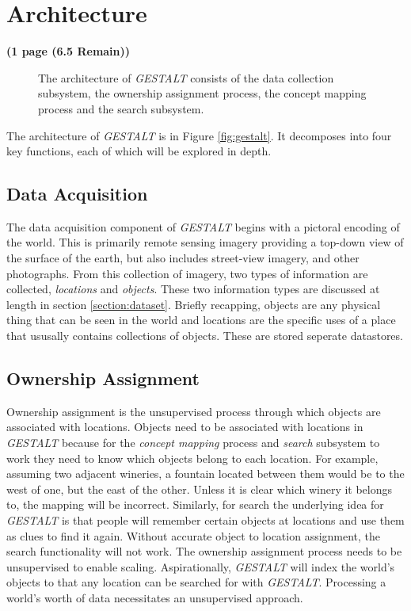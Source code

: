 \section{Architecture}
\label{section:architecture}
\textbf{(1 page (6.5 Remain))}

\begin{figure*}[t]
	\label{fig:architecture}
	
	\centering
	\caption[widht=\textwidth]{The architecture of \textit{GESTALT} consists of the data collection subsystem, the ownership assignment process, the concept mapping process and the search subsystem.}
\end{figure*}

The architecture of \textit{GESTALT} is in Figure \ref{fig:gestalt}. It decomposes into four key functions, each of which will be explored in depth. 

\subsection{Data Acquisition}
The data acquisition component of \textit{GESTALT} begins with a pictoral encoding of the world. 
This is primarily remote sensing imagery providing a top-down view of the surface of the earth, but also includes street-view imagery, and other photographs. 
From this collection of imagery, two types of information are collected, \textit{locations} and \textit{objects}. 
These two information types are discussed at length in section \ref{section:dataset}. 
Briefly recapping, objects are any physical thing that can be seen in the world and locations are the specific uses of a place that ususally contains collections of objects. 
These are stored seperate datastores. 

\subsection{Ownership Assignment}
Ownership assignment is the unsupervised process through which objects are associated with locations. 
Objects need to be associated with locations in \textit{GESTALT} because for the \textit{concept mapping} process and \textit{search} subsystem to work they need to know which objects belong to each location.
For example, assuming two adjacent wineries, a fountain located between them would be to the west of one, but the east of the other. Unless it is clear which winery it belongs to, the mapping will be incorrect. 
Similarly, for search the underlying idea for \textit{GESTALT} is that people will remember certain objects at locations and use them as clues to find it again. Without accurate object to location assignment, the search functionality will not work. 
The ownership assignment process needs to be unsupervised to enable scaling. Aspirationally, \textit{GESTALT} will index the world's objects to that any location can be searched for with \textit{GESTALT}. Processing a world's worth of data necessitates an unsupervised approach. 

